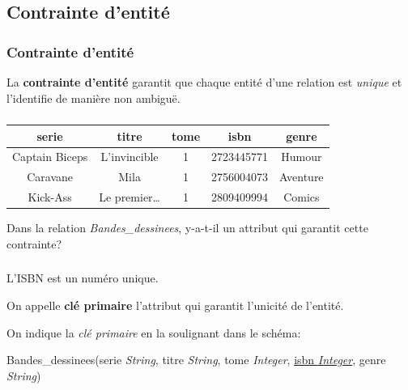 \documentclass[svgnames,11pt]{beamer}
\begin{document}
\subsection{Contrainte d'entité}
\begin{frame}
    \frametitle{Contrainte d'entité}

    \begin{aretenir}[]
        La \textbf{contrainte d'entité} garantit que chaque entité d'une relation est \emph{unique} et l'identifie de manière non ambiguë.
    \end{aretenir}

\end{frame}
\begin{frame}
    \frametitle{}

    \begin{center}
        \begin{tabular}{|*{5}{c|}}
            \hline
            serie          & titre           & tome & isbn       & genre    \\
            \hline
            Captain Biceps & L’invincible    & 1    & 2723445771 & Humour   \\
            Caravane       & Mila            & 1    & 2756004073 & Aventure \\
            Kick-Ass       & Le premier\dots & 1    & 2809409994 & Comics   \\
            \hline
        \end{tabular}
    \end{center}
    \begin{activite}
        Dans la relation \emph{Bandes\_dessinees}, y-a-t-il un attribut qui garantit cette contrainte?
    \end{activite}
\end{frame}
\begin{frame}
    \frametitle{}

    L'ISBN est un numéro unique.

    \begin{aretenir}[]
        On appelle \textbf{clé primaire} l'attribut qui garantit l'unicité de l'entité.
        \end{aretenir}
        On indique la \emph{clé primaire} en la soulignant dans le schéma:\\
\begin{center}
    Bandes\_dessinees(serie \emph{String}, titre \emph{String}, tome \emph{Integer}, \underline{isbn \emph{Integer}}, genre \emph{String})
\end{center}

\end{frame}
\end{document}
